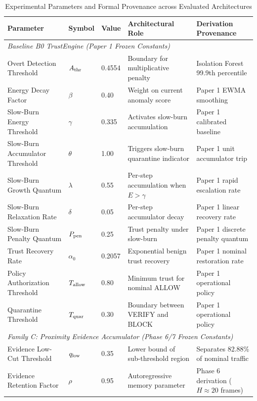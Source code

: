 \begin{table}[t]
\centering
\caption{Experimental Parameters and Formal Provenance across Evaluated Architectures}
\label{tab:parameter_provenance}
\small
\begin{tabular}{lllll}
\hline
\textbf{Parameter} & \textbf{Symbol} & \textbf{Value} & \textbf{Architectural Role} & \textbf{Derivation Provenance} \\
\hline
\multicolumn{5}{l}{\textit{Baseline B0 TrustEngine (Paper 1 Frozen Constants)}} \\
Overt Detection Threshold & $A_{\rm thr}$ & 0.4554 & Boundary for multiplicative penalty & Isolation Forest 99.9th percentile \\
Energy Decay Factor & $\beta$ & 0.40 & Weight on current anomaly score & Paper 1 EWMA smoothing \\
Slow-Burn Energy Threshold & $\gamma$ & 0.335 & Activates slow-burn accumulation & Paper 1 calibrated baseline \\
Slow-Burn Accumulator Threshold & $\theta$ & 1.00 & Triggers slow-burn quarantine indicator & Paper 1 unit accumulator trip \\
Slow-Burn Growth Quantum & $\lambda$ & 0.55 & Per-step accumulation when $E > \gamma$ & Paper 1 rapid escalation rate \\
Slow-Burn Relaxation Rate & $\delta$ & 0.05 & Per-step accumulator decay & Paper 1 linear recovery rate \\
Slow-Burn Penalty Quantum & $P_{\rm pen}$ & 0.25 & Trust penalty under slow-burn & Paper 1 discrete penalty quantum \\
Trust Recovery Rate & $\alpha_0$ & 0.2057 & Exponential benign trust recovery & Paper 1 nominal restoration rate \\
Policy Authorization Threshold & $T_{\rm allow}$ & 0.80 & Minimum trust for nominal ALLOW & Paper 1 operational policy \\
Quarantine Threshold & $T_{\rm quar}$ & 0.30 & Boundary between VERIFY and BLOCK & Paper 1 operational policy \\
\hline
\multicolumn{5}{l}{\textit{Family C: Proximity Evidence Accumulator (Phase 6/7 Frozen Constants)}} \\
Evidence Low-Cut Threshold & $q_{\rm low}$ & 0.35 & Lower bound of sub-threshold region & Separates 82.88\% of nominal traffic \\
Evidence Retention Factor & $\rho$ & 0.95 & Autoregressive memory parameter & Phase 6 derivation ($H \approx 20$ frames) \\

\end{tabular}
\end{table}
